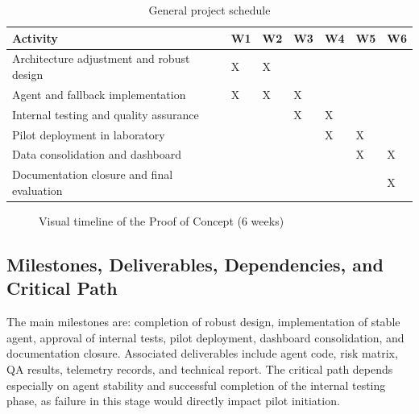 \documentclass[12pt,a4paper]{article}
\begin{document}
\begin{table}[H]
\caption{General project schedule}
\label{tab:schedule}
\centering
\begin{tabular}{|p{4.2cm}|p{1.1cm}|p{1.1cm}|p{1.1cm}|p{1.1cm}|p{1.1cm}|p{1.1cm}|}
\hline
\textbf{Activity} & \textbf{W1} & \textbf{W2} & \textbf{W3} & \textbf{W4} & \textbf{W5} & \textbf{W6} \\
\hline
Architecture adjustment and robust design & X & X &  &  &  &  \\
\hline
Agent and fallback implementation & X & X & X &  &  &  \\
\hline
Internal testing and quality assurance &  &  & X & X &  &  \\
\hline
Pilot deployment in laboratory &  &  &  & X & X &  \\
\hline
Data consolidation and dashboard &  &  &  &  & X & X \\
\hline
Documentation closure and final evaluation &  &  &  &  &  & X \\
\hline
\end{tabular}
\end{table}

\begin{figure}[H]
\centering
{}
\caption{Visual timeline of the Proof of Concept (6 weeks)}
\label{fig:timeline}
\end{figure}

\subsection{Milestones, Deliverables, Dependencies, and Critical Path}
The main milestones are: completion of robust design, implementation of stable agent, approval of internal tests, pilot deployment, dashboard consolidation, and documentation closure. Associated deliverables include agent code, risk matrix, QA results, telemetry records, and technical report. The critical path depends especially on agent stability and successful completion of the internal testing phase, as failure in this stage would directly impact pilot initiation.
\end{document}
